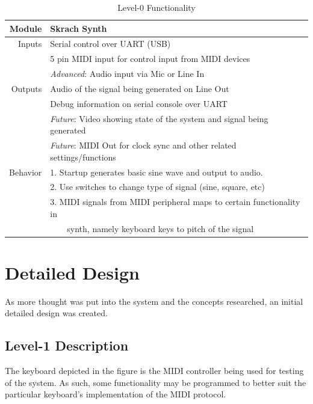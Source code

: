 \documentclass[12pt]{article}
\begin{document}
\begin{table}[htb]
    \centering
    \begin{tabularx}{\linewidth}{r|l}
        Module  & Skrach Synth \\\hline
        
        Inputs  & Serial control over UART (USB)\\
                & 5 pin MIDI input for control input from MIDI devices\\
                & \emph{Advanced}: Audio input via Mic or Line In\\\hline
                
        Outputs & Audio of the signal being generated on Line Out\\
                & Debug information on serial console over UART\\
                & \emph{Future}: Video showing state of the system and signal being generated\\
                & \emph{Future}: MIDI Out for clock sync and other related settings/functions\\\hline
        Behavior& 1. Startup generates basic sine wave and output to audio.\\
                & 2. Use switches to change type of signal (sine, square, etc)\\
                & 3. MIDI signals from MIDI peripheral maps to certain functionality in\\
                & \ \ \ \ synth, namely keyboard keys to pitch of the signal\\
    \end{tabularx}
    \caption{Level-0 Functionality}
    \label{tab:level_0_table}
\end{table}

\newpage

\section{Detailed Design}

As more thought was put into the system and the concepts researched, an initial detailed design was created.

\subsection{Level-1 Description}

The keyboard depicted in the figure is the MIDI controller being used for testing of the system. As such, some functionality may be programmed to better suit the particular keyboard's implementation of the MIDI protocol.
\end{document}
